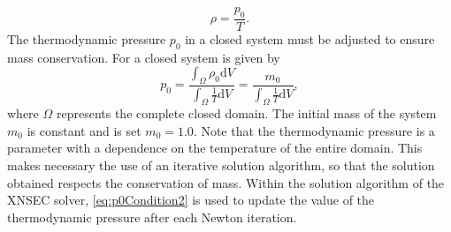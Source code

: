 \begin{equation}
	\rho = \frac{p_0}{T}.
\end{equation}
The thermodynamic pressure $p_0$ in a closed system must be adjusted to ensure mass conservation. For a closed system is given by
\begin{equation}
	p_0 =\frac{\int_\Omega \rho_0\text{d}V}{\int_\Omega \frac{1}{T}\text{d}V}= \frac{m_0}{\int_\Omega \frac{1}{T}\text{d}V}, \label{eq:p0Condition2}
\end{equation}
where $\Omega$ represents the complete closed domain. The initial mass of the system $m_0$ is constant and is set $m_0 = 1.0$. Note that the thermodynamic pressure is a parameter with a dependence on the temperature of the entire domain. This makes necessary the use of an iterative solution algorithm, so that the solution obtained respects the conservation of mass. Within the solution algorithm of the XNSEC solver, \cref{eq:p0Condition2} is used to update the value of the thermodynamic pressure after each Newton iteration.



